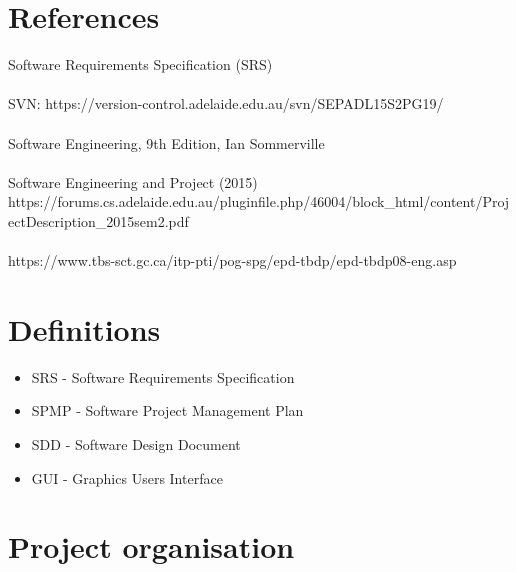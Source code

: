 \documentclass[11pt, a4paper]{article}
\begin{document}
\section{References}
Software Requirements Specification (SRS)\\
\\
SVN: https://version-control.adelaide.edu.au/svn/SEPADL15S2PG19/\\
\\
Software Engineering, 9th Edition, Ian Sommerville\\
\\
Software Engineering and Project (2015)\\
https://forums.cs.adelaide.edu.au/pluginfile.php/46004/block\_html/content/ProjectDescription\_2015sem2.pdf\\
\\
https://www.tbs-sct.gc.ca/itp-pti/pog-spg/epd-tbdp/epd-tbdp08-eng.asp\\

\section{Definitions}
\begin{itemize}
\item {SRS - }Software Requirements Specification\\
\item {SPMP - }Software Project Management Plan\\
\item {SDD - }Software Design Document\\
\item {GUI - }Graphics Users Interface
\end{itemize}
\newpage

\section{Project organisation}
\end{document}
